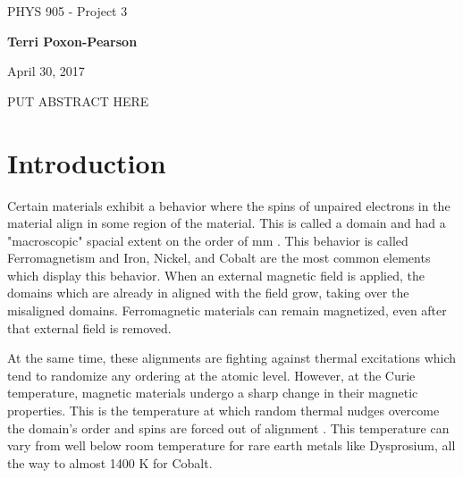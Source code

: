 \documentclass[%
oneside,                 %
final,                   %
10pt]{article}
\begin{document}

\newcommand{\exercisesection}[1]{\subsection*{#1}}






\thispagestyle{empty}

\begin{center}
{\LARGE\bf
\begin{spacing}{1.25}
PHYS 905 - Project 3
\end{spacing}
}
\end{center}


\begin{center}
{\bf Terri Poxon-Pearson}
\end{center}

    

\begin{center}
April 30, 2017
\end{center}

\vspace{1cm}

PUT ABSTRACT HERE

\tableofcontents
 
\section{Introduction}

Certain materials exhibit a behavior where the spins of unpaired electrons in the material align in some region of the material.  This is called a domain and had a "macroscopic" spacial extent on the order of mm \cite{LectureNotes}.  This behavior is called Ferromagnetism and Iron, Nickel, and Cobalt are the most common elements which display this behavior.  When an external magnetic field is applied, the domains which are already in aligned with the field grow, taking over the misaligned domains.  Ferromagnetic materials can remain magnetized, even after that external field is removed.

At the same time, these alignments are fighting against thermal excitations which tend to randomize any ordering at the atomic level.  However, at the Curie temperature, magnetic materials undergo a sharp change in their magnetic properties.  This is the temperature at which random thermal nudges overcome the domain's order and spins are forced out of alignment \cite{Curie}.  This temperature can vary from well below room temperature for rare earth metals like Dysprosium, all the way to almost 1400 K for Cobalt.
\end{document}
